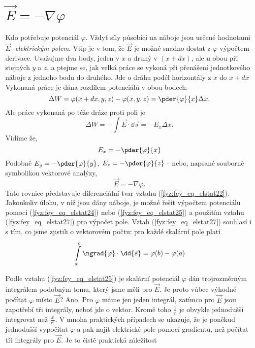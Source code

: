   \section{\texorpdfstring{\(\vec{E} = -\nabla\varphi\)}{Gradient potenciálu}}\label{fyz:IIchapIVsecIV}
    \cite[s.~70]{Feynman02} Kdo potřebuje potenciál \(\varphi\). Vždyť síly působící na náboje jsou 
    určené hodnotami \(\vec{E}\) -\emph{elektrickým polem}. Vtip je v tom, že \(\vec{E}\) je možné 
    snadno dostat z \(\varphi\) výpočtem derivace. Uvažujme dva body, jeden v \(x\) a druhý v \((x 
    + dx)\), ale u obou při stejných \(y\) a \(z\), a ptejme se, jak velká práce se vykoná při 
    přenášení jednotkového náboje z jednoho bodu do druhého. Jde o dráhu podél 	horizontály z \(x\) 
    do \(x + dx\) Vykonaná práce je dána rozdílem potenciálů v obou bodech:
    \begin{equation*}
     \Delta W = \varphi(x+dx, y, z) - \varphi(x, y, z) = \pder{\varphi}{x}\Delta x.
    \end{equation*}
    Ale práce vykonaná po téže dráze proti poli je
    \begin{equation*}
     \Delta W = - \int\vec{E}\cdot\dd{\vec{s}} = - E_x \Delta x.
    \end{equation*}
    Vidíme že,
    \begin{equation}\label{fyz:fey_eq_elstat26}
    E_x = -\pder{\varphi}{x}
    \end{equation}
    Podobně \(E_y = -\pder{\varphi}{y}\), \(E_z = -\pder{\varphi}{z}\) - nebo, napsané souborné 
    symbolikou vektorové analýzy,
    \begin{equation}\label{fyz:fey_eq_elstat27}
    \vec{E} = -\nabla\varphi.
    \end{equation}    
    Tato rovnice představuje diferenciální tvar vztahu (\ref{fyz:fey_eq_elstat22}). Jakoukoliv 
    úlohu, v níž jsou dány náboje, je možné řešit výpočtem potenciálu pomocí 
    (\ref{fyz:fey_eq_elstat24}) nebo (\ref{fyz:fey_eq_elstat25}) a použitím vztahu 
    (\ref{fyz:fey_eq_elstat27}) pro výpočet pole. Vztah (\ref{fyz:fey_eq_elstat27}) souhlasí i s 
    tím, co jsme zjistili o vektorovém počtu: pro každé skalární pole platí
    \begin{equation}\label{fyz:fey_eq_elstat28}
     \int\limits_{a}^{b}\ngrad{\varphi}\cdot\dd{\vec{s}} = \varphi(b) - \varphi(a)
    \end{equation}     
    
    Podle vztahu (\ref{fyz:fey_eq_elstat25}) je skalární potenciál \(\varphi\) dán trojrozměrným 
    integrálem podobným tomu, který jsme měli pro \(\vec{E}\). Je proto vůbec výhodné počítat 
    \(\varphi\) místo \(\vec{E}\)? Ano. Pro \(\varphi\) máme jen jeden integrál, zatímco pro 
    \(\vec{E}\) jsou zapotřebí tři integrály, neboť jde o vektor. Kromě toho \(\frac{1}{r}\) je 
    obvykle jednodušší integrovat než \(\frac{x}{r^3}\). V mnoha praktických případech se ukazuje, 
    že je poněkud jednodušší vypočítat \(\varphi\) a pak najít elektrické pole pomocí gradientu, 
    než počítat tři integrály pro \(\vec{E}\). Je to čistě praktická záležitost
    
